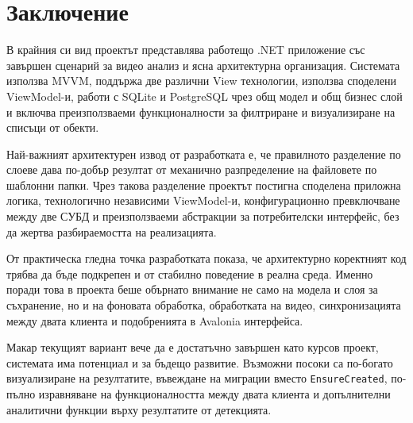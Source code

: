 \chapter{Заключение}

В крайния си вид проектът представлява работещо .NET приложение със завършен сценарий за видео анализ и ясна архитектурна организация. Системата използва MVVM, поддържа две различни View технологии, използва споделени ViewModel-и, работи с SQLite и PostgreSQL чрез общ модел и общ бизнес слой и включва преизползваеми функционалности за филтриране и визуализиране на списъци от обекти.

Най-важният архитектурен извод от разработката е, че правилното разделение по слоеве дава по-добър резултат от механично разпределение на файловете по шаблонни папки. Чрез такова разделение проектът постигна споделена приложна логика, технологично независими ViewModel-и, конфигурационно превключване между две СУБД и преизползваеми абстракции за потребителски интерфейс, без да жертва разбираемостта на реализацията.

От практическа гледна точка разработката показа, че архитектурно коректният код трябва да бъде подкрепен и от стабилно поведение в реална среда. Именно поради това в проекта беше обърнато внимание не само на модела и слоя за съхранение, но и на фоновата обработка, обработката на видео, синхронизацията между двата клиента и подобренията в Avalonia интерфейса.

Макар текущият вариант вече да е достатъчно завършен като курсов проект, системата има потенциал и за бъдещо развитие. Възможни посоки са по-богато визуализиране на резултатите, въвеждане на миграции вместо \texttt{EnsureCreated}, по-пълно изравняване на функционалността между двата клиента и допълнителни аналитични функции върху резултатите от детекцията.
